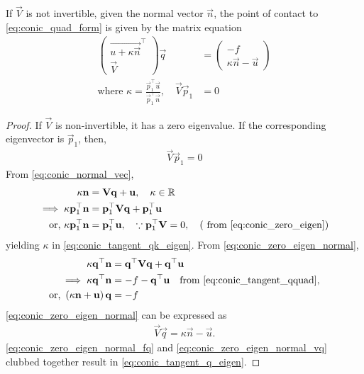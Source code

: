 \documentclass[journal,12pt,onecolumn]{IEEEtran}
\begin{document}
\begin{theorem}
  If $\vec{V}$ is not invertible,  given the normal vector $\vec{n}$, the point of contact to \eqref{eq:conic_quad_form} is given by the matrix equation
\begin{align}
\label{eq:conic_tangent_q_eigen}
\begin{pmatrix}
\vec{u+\kappa \vec{n}}^{\top} \\ \vec{V}
\end{pmatrix}
\vec{q} &= 
\begin{pmatrix}
-f
\\
\kappa\vec{n}-\vec{u}
\end{pmatrix}
\\
\text{where }  \kappa = \frac{\vec{p}_1^{\top}\vec{u}}{\vec{p}_1^{\top}\vec{n}}, \quad \vec{V}\vec{p}_1 &= 0
\label{eq:conic_tangent_qk_eigen}
\end{align}

\end{theorem}
\begin{proof}
  If $\vec{V}$ is non-invertible, it has a zero eigenvalue.  If the corresponding eigenvector is $\vec{p}_1$, then,
\begin{align}
\vec{V}\vec{p}_1 = 0
\label{eq:conic_zero_eigen}
\end{align}
From \eqref{eq:conic_normal_vec},
\begin{align}
\label{eq:conic_zero_eigen_normal}
\kappa \mathbf{n} &= \mathbf{V} \mathbf{q}+\mathbf{u}, \quad \kappa \in \mathbb{R}
\\
\implies \kappa \mathbf{p}_1^{\top}\mathbf{n} &= \mathbf{p}_1^{\top}\mathbf{V} \mathbf{q}+\mathbf{p}_1^{\top}\mathbf{u}
\\
\text{or, } \kappa \mathbf{p}_1^{\top}\mathbf{n} &= \mathbf{p}_1^{\top}\mathbf{u},  \quad \because \mathbf{p}_1^{\top} \mathbf{V} = 0, 
\quad 
\left(\text{ from } \eqref{eq:conic_zero_eigen}\right)
\end{align}
yielding $\kappa$ in \eqref{eq:conic_tangent_qk_eigen}. From \eqref{eq:conic_zero_eigen_normal},
\begin{align}
\kappa \mathbf{q}^{\top}\mathbf{n} &= \mathbf{q}^{\top}\mathbf{V} \mathbf{q}+\mathbf{q}^{\top}\mathbf{u}
\\
\implies \kappa \mathbf{q}^{\top}\mathbf{n} &= -f-\mathbf{q}^{\top}\mathbf{u} \quad \text{from } \eqref{eq:conic_tangent_qquad},
\\
\text{or, } \left(\kappa \mathbf{n}+\mathbf{u}\right)\mathbf{q} &= -f
\label{eq:conic_zero_eigen_normal_fq}
\end{align}
\eqref{eq:conic_zero_eigen_normal} can be expressed as
\begin{align}
\label{eq:conic_zero_eigen_normal_vq}
\vec{V} \vec{q} = \kappa \vec{n} - \vec{u}.
\end{align}
\eqref{eq:conic_zero_eigen_normal_fq} and \eqref{eq:conic_zero_eigen_normal_vq} clubbed together result in \eqref{eq:conic_tangent_q_eigen}.
\end{proof}
\end{document}
